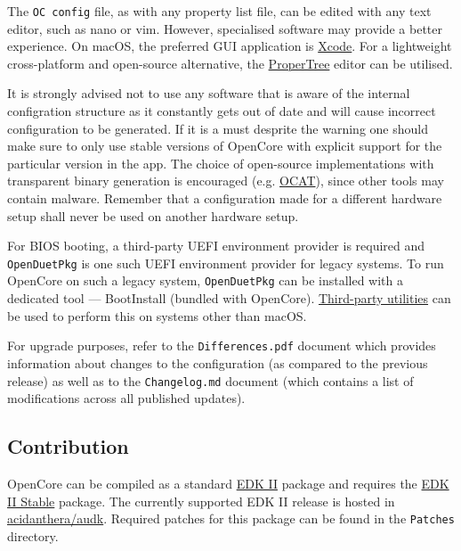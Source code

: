 \documentclass[]{article}
\begin{document}
The \texttt{OC\ config} file, as with any property list file, can be edited with
any text editor, such as nano or vim. However, specialised software
may provide a better experience. On macOS, the preferred GUI application is
\href{https://developer.apple.com/xcode}{Xcode}. For a lightweight
cross-platform and open-source alternative, the
\href{https://github.com/corpnewt/ProperTree}{ProperTree} editor can be
utilised.

It is strongly advised not to use any software that is aware of the internal
configration structure as it constantly gets out of date and will cause
incorrect configuration to be generated. If it is a must desprite the
warning one should make sure to only use stable versions of OpenCore
with explicit support for the particular version in the app. The choice
of open-source implementations with transparent binary generation
is encouraged (e.g. \href{https://github.com/ic005k/QtOpenCoreConfig}{OCAT}),
since other tools may contain malware. Remember that a configuration
made for a different hardware setup shall never be used on another hardware
setup.

For BIOS booting, a third-party UEFI environment provider is required and
\texttt{OpenDuetPkg} is one such UEFI environment provider for legacy systems.
To run OpenCore on such a legacy system, \texttt{OpenDuetPkg} can be installed
with a dedicated tool --- BootInstall (bundled with OpenCore).
\href{https://github.com/corpnewt/gibMacOS}{Third-party utilities} can be used
to perform this on systems other than macOS.

For upgrade purposes, refer to the \texttt{Differences.pdf} document which provides
information about changes to the configuration (as compared to the previous release)
as well as to the \texttt{Changelog.md} document (which contains a list of
modifications across all published updates).

\subsection{Contribution}\label{configuration-comp}

OpenCore can be compiled as a standard
\href{https://github.com/tianocore/tianocore.github.io/wiki/EDK-II}{EDK II}
package and requires the
\href{https://github.com/tianocore/tianocore.github.io/wiki/EDK-II#stable-tags}{EDK II Stable}
package. The currently supported EDK II release is hosted in
\href{https://github.com/acidanthera/audk}{acidanthera/audk}. Required patches
for this package can be found in the \texttt{Patches} directory.
\end{document}
